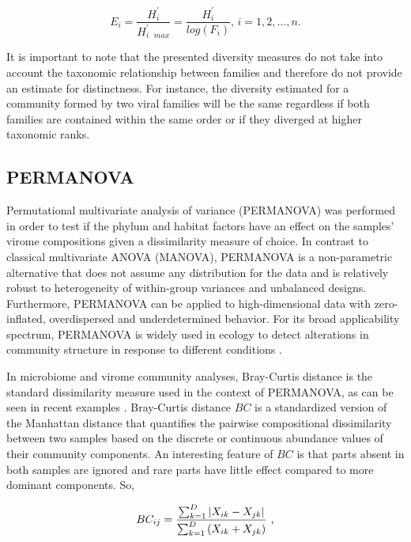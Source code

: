 \documentclass[
  openany]{book}
\begin{document}
\begin{equation} 
  E_i = \frac{H^\prime_i}{H^\prime_{i\text{ }max}} = \frac{H^\prime_i}{log(F_i)} \text{, } i = 1,2, \ldots, n.
  \label{eq:evenness}
\end{equation}

It is important to note that the presented diversity measures do not take into account the taxonomic relationship between families and therefore do not provide an estimate for distinctness. For instance, the diversity estimated for a community formed by two viral families will be the same regardless if both families are contained within the same order or if they diverged at higher taxonomic ranks.

\hypertarget{permanova}{%
\subsection{PERMANOVA}\label{permanova}}

Permutational multivariate analysis of variance (PERMANOVA) was performed in order to test if the phylum and habitat factors have an effect on the samples' virome compositions given a dissimilarity measure of choice. In contrast to classical multivariate ANOVA (MANOVA), PERMANOVA is a non-parametric alternative that does not assume any distribution for the data and is relatively robust to heterogeneity of within-group variances and unbalanced designs. Furthermore, PERMANOVA can be applied to high-dimensional data with zero-inflated, overdispersed and underdetermined behavior. For its broad applicability spectrum, PERMANOVA is widely used in ecology to detect alterations in community structure in response to different conditions \autocite{Anderson2017}.

In microbiome and virome community analyses, Bray-Curtis distance is the standard dissimilarity measure used in the context of PERMANOVA, as can be seen in recent examples \autocite{Lu2021,Hegarty2022,Kaelin2022}. Bray-Curtis distance \(BC\) is a standardized version of the Manhattan distance that quantifies the pairwise compositional dissimilarity between two samples based on the discrete or continuous abundance values of their community components. An interesting feature of \(BC\) is that parts absent in both samples are ignored and rare parts have little effect compared to more dominant components. So,

\begin{equation} 
  BC_{ij} = \frac{\sum^D_{k = 1} \left|X_{ik} - X_{jk}\right|} {\sum^D_{k=1}\left(X_{ik}+X_{jk}\right)} \text{ ,}\\
  \label{eq:BrayCurtis}
\end{equation}
\end{document}
